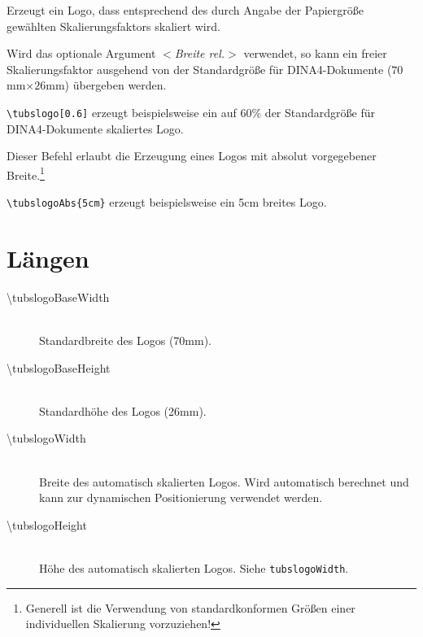 \begin{description}\label{cmd:tubslogo}
  \item[\color{tuRed}\mdseries\ttfamily \textbackslash tubslogo%
    {[\textcolor{tuGreenDark}{\sffamily\itshape $<$Breite rel.$>$}]}]
    Erzeugt ein Logo, dass entsprechend des durch Angabe der Papiergröße
    gewählten Skalierungsfaktors skaliert wird.

    Wird das optionale Argument {\sffamily\itshape $<$Breite rel.$>$}
    verwendet, so kann ein freier Skalierungsfaktor ausgehend von der
    Standardgröße für DINA4-Dokumente ($70$mm$\times 26$mm) übergeben werden.

    \lstinline!\tubslogo[0.6]! erzeugt beispielsweise ein auf 60\% der 
    Standardgröße für DINA4-Dokumente skaliertes Logo.

  \item[\color{tuRed}\mdseries\ttfamily \textbackslash tubslogoAbs%
    \{\textcolor{tuGreenDark}{Breite abs.}\}]
    Dieser Befehl erlaubt die Erzeugung eines Logos mit absolut vorgegebener
    Breite.\footnote{Generell ist die Verwendung von standardkonformen Größen
    einer individuellen Skalierung vorzuziehen!}

    \lstinline!\tubslogoAbs{5cm}! erzeugt beispielsweise ein 5cm breites Logo.
\end{description}


\section{Längen}
  \begin{description}
    \item[\mdseries\ttfamily \textbackslash tubslogoBaseWidth]\hfill\\
      Standardbreite des Logos (70mm).
    \item[\mdseries\ttfamily \textbackslash tubslogoBaseHeight]\hfill\\
      Standardhöhe des Logos (26mm).
    \item[\mdseries\ttfamily \textbackslash tubslogoWidth]\hfill\\
      Breite des automatisch skalierten Logos. Wird automatisch berechnet und
      kann zur dynamischen Positionierung verwendet werden.
    \item[\mdseries\ttfamily \textbackslash tubslogoHeight]\hfill\\
      Höhe des automatisch skalierten Logos. Siehe \lstinline{tubslogoWidth}.
  \end{description}
